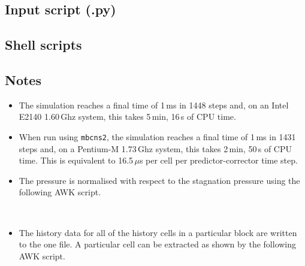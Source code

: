 \newpage
\subsection{Input script (.py)}
\topbar

\bottombar


\subsection{Shell scripts}
\label{back-sh-files}
\topbar

\bottombar

\noindent
\topbar

\bottombar

\noindent
\topbar
{}
\bottombar

\newpage
\subsection{Notes}
\begin{itemize}
\item The simulation reaches a final time of 1\,ms in 1448 steps and,
      on an Intel E2140 1.60\,Ghz system, this takes 5\,min, 16\,s of CPU time.
\item When run using \texttt{mbcns2}, the simulation reaches a final time of 1\,ms in 1431 steps and,
      on a Pentium-M 1.73\,Ghz system, this takes 2\,min, 50\,s of CPU time.
      This is equivalent to 16.5\,$\mu$s per cell per predictor-corrector
      time step.
\item The pressure is normalised with respect to the stagnation pressure
      using the following AWK script.\\
      \topbarshort
      
      \bottombarshort\\
\item The history data for all of the history cells in a particular block are
      written to the one file.
      A particular cell can be extracted as shown by the following AWK script.\\
      \topbarshort
      
      \bottombarshort\\
\end{itemize}
